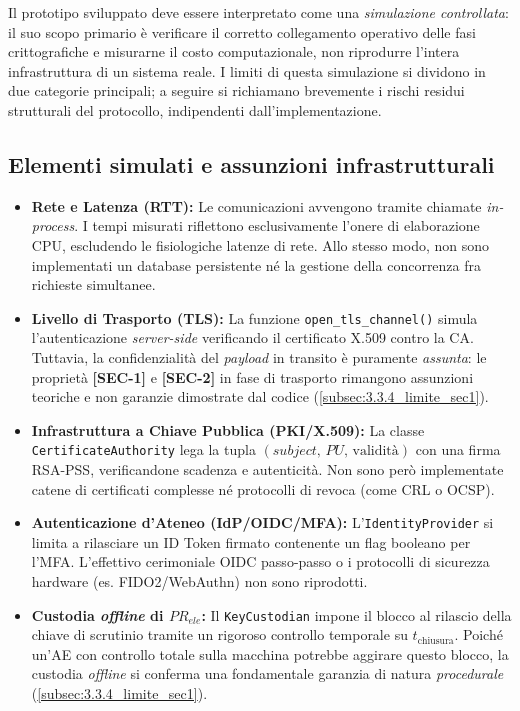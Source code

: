 Il prototipo sviluppato deve essere interpretato come una \emph{simulazione controllata}: il suo scopo primario è verificare il corretto collegamento operativo delle fasi crittografiche e misurarne il costo computazionale, non riprodurre l'intera infrastruttura di un sistema reale. I limiti di questa simulazione si dividono in due categorie principali; a seguire si richiamano brevemente i rischi residui strutturali del protocollo, indipendenti dall'implementazione.

\subsection{Elementi simulati e assunzioni infrastrutturali}
\label{subsec:wp4_simulati}

\begin{itemize}
  \item \textbf{Rete e Latenza (RTT):} Le comunicazioni avvengono tramite chiamate \emph{in-process}. I tempi misurati riflettono esclusivamente l'onere di elaborazione CPU, escludendo le fisiologiche latenze di rete. Allo stesso modo, non sono implementati un database persistente né la gestione della concorrenza fra richieste simultanee.

  \item \textbf{Livello di Trasporto (TLS):} La funzione \texttt{open\_tls\_channel()} simula l'autenticazione \emph{server-side} verificando il certificato X.509 contro la CA. Tuttavia, la confidenzialità del \emph{payload} in transito è puramente \emph{assunta}: le proprietà \textbf{[SEC-1]} e \textbf{[SEC-2]} in fase di trasporto rimangono assunzioni teoriche e non garanzie dimostrate dal codice (\ref{subsec:3.3.4_limite_sec1}).

  \item \textbf{Infrastruttura a Chiave Pubblica (PKI/X.509):} La classe \texttt{CertificateAuthority} lega la tupla $(\mathit{subject},\,PU,\,\text{validità})$ con una firma RSA-PSS, verificandone scadenza e autenticità. Non sono però implementate catene di certificati complesse né protocolli di revoca (come CRL o OCSP).

  \item \textbf{Autenticazione d'Ateneo (IdP/OIDC/MFA):} L'\texttt{IdentityProvider} si limita a rilasciare un ID Token firmato contenente un flag booleano per l'MFA. L'effettivo cerimoniale OIDC passo-passo o i protocolli di sicurezza hardware (es. FIDO2/WebAuthn) non sono riprodotti.

  \item \textbf{Custodia \emph{offline} di $PR_{ele}$:} Il \texttt{KeyCustodian} impone il blocco al rilascio della chiave di scrutinio tramite un rigoroso controllo temporale su $t_{\text{chiusura}}$. Poiché un'AE con controllo totale sulla macchina potrebbe aggirare questo blocco, la custodia \emph{offline} si conferma una fondamentale garanzia di natura \emph{procedurale} (\ref{subsec:3.3.4_limite_sec1}).


\end{itemize}
